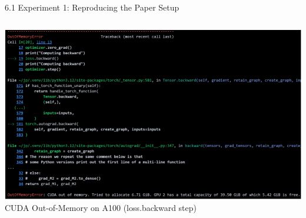\documentclass[aspectratio=169,xcolor=dvipsnames]{beamer}
\begin{document}
\begin{frame}{6.1 Experiment 1: Reproducing the Paper Setup}
\begin{columns}[T]
\begin{column}{0.50\textwidth}
\begin{center}
\vspace{0.2cm}
\includegraphics[width=0.95\linewidth]{OutofMemory.png}
\vspace{-0.2cm}
\tiny CUDA Out-of-Memory on A100 (loss.backward step)
\end{center}
\end{column}

\end{columns}
\end{frame}
\end{document}
